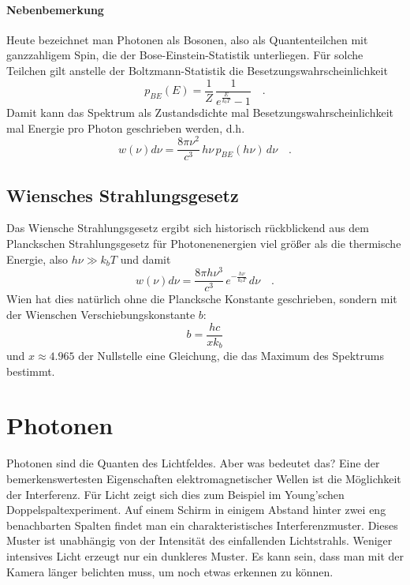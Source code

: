 \paragraph*{Nebenbemerkung} Heute bezeichnet man Photonen als Bosonen, also als Quantenteilchen mit ganzzahligem Spin, die der Bose-Einstein-Statistik unterliegen. Für solche Teilchen gilt anstelle der Boltzmann-Statistik die Besetzungswahrscheinlichkeit
\begin{equation}
   p_{BE}(E) = \frac{1}{Z} \, \frac{1}{e^{\frac{E}{k_b T}} -1}  \quad .
\end{equation}
Damit kann das Spektrum als Zustandsdichte mal Besetzungswahrscheinlichkeit mal Energie pro Photon geschrieben werden, d.h. 
\begin{equation}
   w(\nu) d\nu = \frac{8 \pi \nu^2}{c^3} \, h \nu \, p_{BE}(h\nu) \, d\nu   \quad .
\end{equation}




\subsection{Wiensches Strahlungsgesetz}
Das Wiensche Strahlungsgesetz ergibt sich historisch rückblickend aus dem Planckschen Strahlungsgesetz für Photonenenergien viel größer als die thermische Energie, also $h \nu \gg k_b T$ und damit 
\begin{equation}
    w(\nu) d\nu    =  \frac{8 \pi h \nu^3}{c^3} \,  e^{- \frac{h \nu}{k_b T}} \, d\nu  \quad .
\end{equation}
Wien hat dies natürlich ohne die Plancksche Konstante geschrieben, sondern mit der Wienschen Verschiebungskonstante $b$:
\begin{equation}
    b = \frac{h c}{x k_b} 
\end{equation}
und $x \approx 4.965$ der Nullstelle eine Gleichung, die das Maximum des Spektrums bestimmt.


 \section{Photonen}

 Photonen sind die Quanten des Lichtfeldes. Aber was bedeutet das? Eine der bemerkenswertesten Eigenschaften elektromagnetischer Wellen ist die Möglichkeit der Interferenz. Für Licht zeigt sich dies zum Beispiel im Young'schen Doppelspaltexperiment. Auf einem Schirm in einigem Abstand hinter zwei eng benachbarten Spalten findet man ein charakteristisches Interferenzmuster.  Dieses Muster ist unabhängig von der Intensität des einfallenden Lichtstrahls. Weniger intensives Licht erzeugt nur ein dunkleres Muster. Es kann sein, dass man mit der Kamera länger belichten muss, um noch etwas erkennen zu können.

